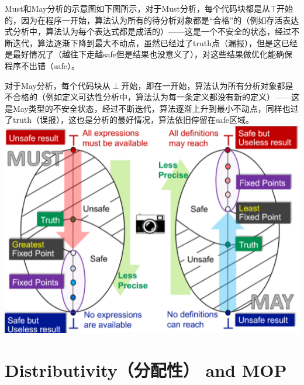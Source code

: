 \documentclass[a4paper]{article}
\theoremstyle{definition}
\begin{document}
Must和May分析的示意图如下图所示，对于Must分析，每个代码块都是从$\top$开始的，因为在程序一开始，算法认为所有的待分析对象都是“合格”的（例如存活表达式分析中，算法认为每个表达式都是成活的）——这是一个不安全的状态，经过不断迭代，算法逐渐下降到最大不动点，虽然已经过了truth点（漏报），但是这已经是最好情况了（越往下走越safe但是结果也没意义了），对这些结果做优化能确保程序不出错（safe）。

对于May分析，每个代码块从$\perp$开始，即在一开始，算法认为所有分析对象都是不合格的（例如定义可达性分析中，算法认为每一条定义都没有新的定义）——这是May类型的不安全状态，经过不断迭代，算法逐渐上升到最小不动点，同样也过了truth（误报），这也是分析的最好情况，算法依旧停留在safe区域。
\includegraphics{img/must.png}

\section{Distributivity（分配性） and MOP}
\end{document}
